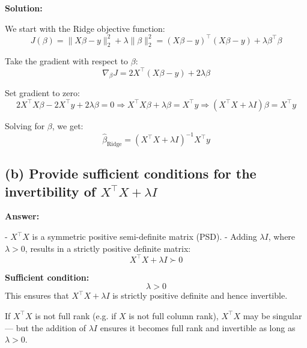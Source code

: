 \documentclass{article}
\begin{document}
\textbf{Solution:}

We start with the Ridge objective function:
\[
J(\beta) = \|X\beta - y\|_2^2 + \lambda \|\beta\|_2^2 = (X\beta - y)^\top (X\beta - y) + \lambda \beta^\top \beta
\]

Take the gradient with respect to \( \beta \):
\[
\nabla_\beta J = 2X^\top (X\beta - y) + 2\lambda \beta
\]

Set gradient to zero:
\[
2X^\top X\beta - 2X^\top y + 2\lambda \beta = 0
\Rightarrow X^\top X\beta + \lambda \beta = X^\top y
\Rightarrow (X^\top X + \lambda I)\beta = X^\top y
\]

Solving for \( \beta \), we get:
\[
\hat{\beta}_{\text{Ridge}} = (X^\top X + \lambda I)^{-1} X^\top y
\]

\subsection*{(b) Provide sufficient conditions for the invertibility of \( X^\top X + \lambda I \)}

\textbf{Answer:}

- \( X^\top X \) is a symmetric positive semi-definite matrix (PSD).
- Adding \( \lambda I \), where \( \lambda > 0 \), results in a strictly positive definite matrix:
\[
X^\top X + \lambda I \succ 0
\]

\textbf{Sufficient condition:}
\[
\lambda > 0
\]
This ensures that \( X^\top X + \lambda I \) is strictly positive definite and hence invertible.

If \( X^\top X \) is not full rank (e.g. if \( X \) is not full column rank), \( X^\top X \) may be singular — but the addition of \( \lambda I \) ensures it becomes full rank and invertible as long as \( \lambda > 0 \).
\end{document}
